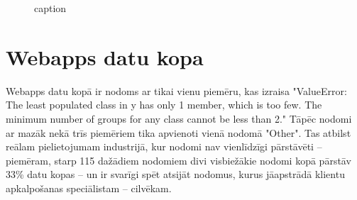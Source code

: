 \begin{figure}[h] 
   \centering
   \caption{caption} 
   \label{fig:askubuntu-xlm-all}
\end{figure}



\section{Webapps datu kopa}


Webapps datu kopā ir nodoms ar tikai vienu piemēru, kas izraisa "ValueError: The least populated class in y has only 1 member, which is too few. The minimum number of groups for any class cannot be less than 2." Tāpēc nodomi ar mazāk nekā trīs piemēriem tika apvienoti vienā nodomā "Other". Tas atbilst reālam pielietojumam industrijā, kur nodomi nav vienlīdzīgi pārstāvēti  -- piemēram, starp 115 dažādiem nodomiem divi visbiežākie nodomi kopā pārstāv 33\% datu kopas \cite{paikens2020} -- un ir svarīgi spēt atsijāt nodomus, kurus jāapstrādā klientu apkalpošanas speciālistam -- cilvēkam.



